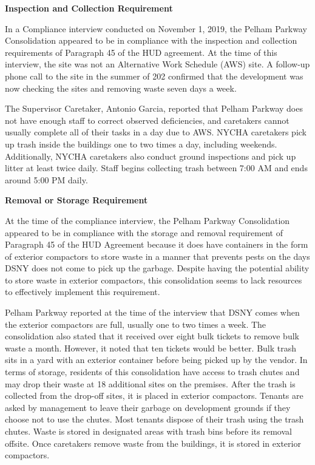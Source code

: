 
\textbf{Inspection and Collection Requirement}  

In a Compliance interview conducted on November 1, 2019, the Pelham Parkway Consolidation appeared to be in compliance with the inspection and collection requirements of Paragraph 45 of the HUD agreement. At the time of this interview, the site was not an Alternative Work Schedule (AWS) site. A follow-up phone call to the site in the summer of 202 confirmed that the development was now checking the sites and removing waste seven days a week.

The Supervisor Caretaker, Antonio Garcia, reported that Pelham Parkway does not have enough staff to correct observed deficiencies, and caretakers cannot usually complete all of their tasks in a day due to AWS. NYCHA caretakers pick up trash inside the buildings one to two times a day, including weekends. Additionally, NYCHA caretakers also conduct ground inspections and pick up litter at least twice daily. Staff begins collecting trash between 7:00 AM and ends around 5:00 PM daily.

 

\textbf{Removal or Storage Requirement}  

At the time of the compliance interview, the Pelham Parkway Consolidation appeared to be in compliance with the storage and removal requirement of Paragraph 45 of the HUD Agreement because it does have containers in the form of exterior compactors to store waste in a manner that prevents pests on the days DSNY does not come to pick up the garbage. Despite having the potential ability to store waste in exterior compactors, this consolidation seems to lack resources to effectively implement this requirement.

 

Pelham Parkway reported at the time of the interview that DSNY comes when the exterior compactors are full, usually one to two times a week. The consolidation also stated that it received over eight bulk tickets to remove bulk waste a month. However, it noted that ten tickets would be better. Bulk trash sits in a yard with an exterior container before being picked up by the vendor. In terms of storage, residents of this consolidation have access to trash chutes and may drop their waste at 18 additional sites on the premises. After the trash is collected from the drop-off sites, it is placed in exterior compactors. Tenants are asked by management to leave their garbage on development grounds if they choose not to use the chutes. Most tenants dispose of their trash using the trash chutes. Waste is stored in designated areas with trash bins before its removal offsite. Once caretakers remove waste from the buildings, it is stored in exterior compactors.

